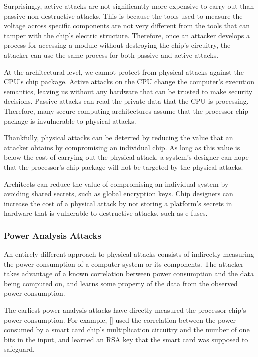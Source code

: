 Surprisingly, active attacks are not significantly more expensive to carry out
than passive non-destructive attacks. This is because the tools used to measure
the voltage across specific components are not very different from the tools
that can tamper with the chip's electric structure. Therefore, once an attacker
develops a process for accessing a module without destroying the chip's
circuitry, the attacker can use the same process for both passive and active
attacks.

At the architectural level, we cannot protect from physical attacks against the
CPU's chip package. Active attacks on the CPU change the computer's execution
semantics, leaving us without any hardware that can be trusted to make security
decisions. Passive attacks can read the private data that the CPU is
processing. Therefore, many secure computing architectures assume that the
processor chip package is invulnerable to physical attacks.

Thankfully, physical attacks can be deterred by reducing the value that an
attacker obtains by compromising an individual chip. As long as this value is
below the cost of carrying out the physical attack, a system's designer can
hope that the processor's chip package will not be targeted by the physical
attacks.

Architects can reduce the value of compromising an individual system by
avoiding shared secrets, such as global encryption keys. Chip designers can
increase the cost of a physical attack by not storing a platform's secrets in
hardware that is vulnerable to destructive attacks, such as e-fuses.


\subsubsection{Power Analysis Attacks}
\label{sec:power_analysis_attacks}

An entirely different approach to physical attacks consists of indirectly
measuring the power consumption of a computer system or its components. The
attacker takes advantage of a known correlation between power consumption and
the data being computed on, and learns some property of the data from the
observed power consumption.

The earliest power analysis attacks have directly measured the processor chip's
power consumption. For example, [] used the correlation between the power
consumed by a smart card chip's multiplication circuitry and the number of one
bits in the input, and learned an RSA key that the smart card was supposed to
safeguard.

